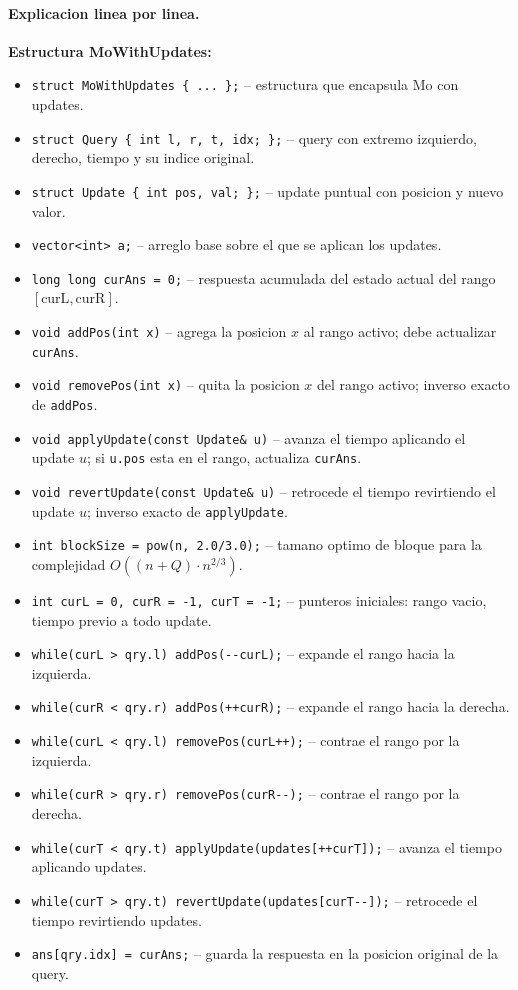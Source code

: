 \paragraph{Explicacion linea por linea.}
\textbf{Estructura MoWithUpdates:}
\begin{itemize}\setlength\itemsep{0pt}
	\item \verb|struct MoWithUpdates { ... };| -- estructura que encapsula Mo con updates.
	\item \verb|struct Query { int l, r, t, idx; };| -- query con extremo izquierdo, derecho, tiempo y su indice original.
	\item \verb|struct Update { int pos, val; };| -- update puntual con posicion y nuevo valor.
	\item \verb|vector<int> a;| -- arreglo base sobre el que se aplican los updates.
	\item \verb|long long curAns = 0;| -- respuesta acumulada del estado actual del rango $[\text{curL}, \text{curR}]$.
	\item \verb|void addPos(int x)| -- agrega la posicion $x$ al rango activo; debe actualizar \verb|curAns|.
	\item \verb|void removePos(int x)| -- quita la posicion $x$ del rango activo; inverso exacto de \verb|addPos|.
	\item \verb|void applyUpdate(const Update& u)| -- avanza el tiempo aplicando el update $u$; si \verb|u.pos| esta en el rango, actualiza \verb|curAns|.
	\item \verb|void revertUpdate(const Update& u)| -- retrocede el tiempo revirtiendo el update $u$; inverso exacto de \verb|applyUpdate|.
	\item \verb|int blockSize = pow(n, 2.0/3.0);| -- tamano optimo de bloque para la complejidad $O((n+Q) \cdot n^{2/3})$.
	\item \verb|int curL = 0, curR = -1, curT = -1;| -- punteros iniciales: rango vacio, tiempo previo a todo update.
	\item \verb|while(curL > qry.l) addPos(--curL);| -- expande el rango hacia la izquierda.
	\item \verb|while(curR < qry.r) addPos(++curR);| -- expande el rango hacia la derecha.
	\item \verb|while(curL < qry.l) removePos(curL++);| -- contrae el rango por la izquierda.
	\item \verb|while(curR > qry.r) removePos(curR--);| -- contrae el rango por la derecha.
	\item \verb|while(curT < qry.t) applyUpdate(updates[++curT]);| -- avanza el tiempo aplicando updates.
	\item \verb|while(curT > qry.t) revertUpdate(updates[curT--]);| -- retrocede el tiempo revirtiendo updates.
	\item \verb|ans[qry.idx] = curAns;| -- guarda la respuesta en la posicion original de la query.
\end{itemize}
